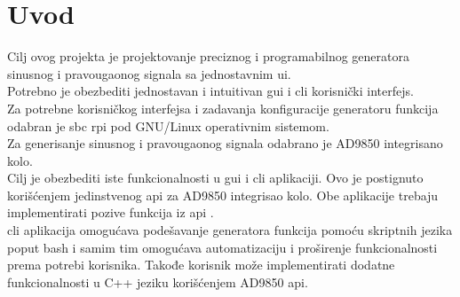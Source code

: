
\section{Uvod}
Cilj ovog projekta je projektovanje preciznog i programabilnog generatora
sinusnog i pravougaonog signala sa jednostavnim \gls{ui}. \\
Potrebno je obezbediti jednostavan i intuitivan \gls{gui} i \gls{cli} korisnički interfejs.
\\

Za potrebne korisničkog interfejsa i zadavanja konfiguracije generatoru funkcija
odabran je \gls{sbc} \gls{rpi} pod GNU/Linux operativnim sistemom. \\
Za generisanje sinusnog i pravougaonog signala odabrano je AD9850 integrisano
kolo. \\

Cilj je obezbediti iste funkcionalnosti u \gls{gui} i \gls{cli} aplikaciji.
Ovo je postignuto korišćenjem jedinstvenog \gls{api} za AD9850 integrisao
kolo. Obe aplikacije trebaju implementirati pozive funkcija iz \gls{api}
.\\

\gls{cli} aplikacija omogućava podešavanje generatora funkcija pomoću skriptnih jezika
poput \gls{bash} i samim tim omogućava automatizaciju i proširenje
funkcionalnosti prema potrebi korisnika. Takođe korisnik može implementirati
dodatne funkcionalnosti u C++ jeziku korišćenjem AD9850 \gls{api}.

